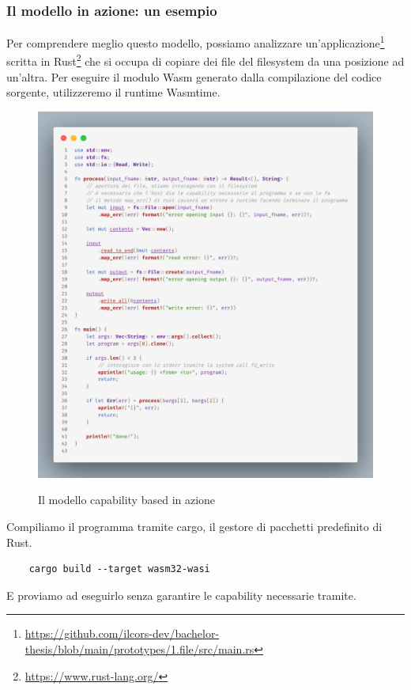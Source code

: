 \subsubsection{Il modello in azione: un esempio}
Per comprendere meglio questo modello, possiamo analizzare
un'applicazione\footnote{\url{https://github.com/ilcors-dev/bachelor-thesis/blob/main/prototypes/1.file/src/main.rs}}
scritta in Rust\footnote{\url{https://www.rust-lang.org/}} che si occupa di copiare dei file del filesystem da una
posizione ad un'altra. Per eseguire il modulo Wasm generato dalla compilazione del codice sorgente, utilizzeremo il
runtime Wasmtime.
\begin{figure}[H]
    \centering
    \captionsetup{justification=centering}
    \includegraphics[width=15cm]{./chapters/2.wasi-in-depth/images/5.wasi_capability_example.png}
    \label{wasi_capabilities_example}
    \caption{Il modello capability based in azione}
\end{figure}
Compiliamo il programma tramite cargo, il gestore di pacchetti predefinito di Rust.
\begin{lstlisting}
    cargo build --target wasm32-wasi
\end{lstlisting}

E proviamo ad eseguirlo senza garantire le capability necessarie tramite.

